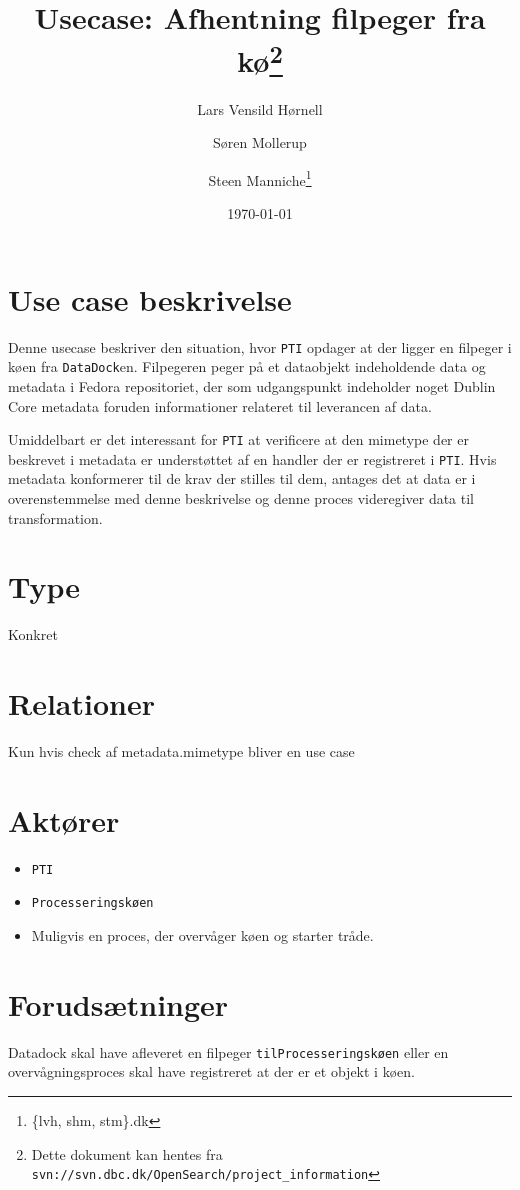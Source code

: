 \documentclass{article}
\author{Lars Vensild Hørnell \and Søren Mollerup \and Steen
  Manniche\thanks{\{lvh, shm, stm\}\@dbc.dk}}
\date{\today}
\title{Usecase: Afhentning filpeger fra kø\thanks{Dette dokument kan hentes fra \texttt{svn://svn.dbc.dk/OpenSearch/project\_information}}}
\begin{document}
\maketitle

\newpage

\tableofcontents

\section{Use case beskrivelse}
Denne usecase beskriver den situation, hvor
\texttt{PTI} opdager at der ligger en filpeger i køen fra
\texttt{DataDock}en. Filpegeren peger på et dataobjekt indeholdende
data og metadata i Fedora repositoriet, der som udgangspunkt
indeholder noget Dublin Core metadata foruden informationer relateret
til leverancen af data.

Umiddelbart er det interessant for \texttt{PTI} at
verificere at den mimetype der er beskrevet i metadata er understøttet
af en handler der er registreret i \texttt{PTI}. Hvis
metadata konformerer til de krav der stilles til dem, antages det at
data er i overenstemmelse med denne beskrivelse og denne proces
videregiver data til transformation.

\section{Type}
Konkret

\section{Relationer}
Kun hvis check af metadata.mimetype bliver en use case

\section{Aktører}
\begin{itemize}
\item \texttt{PTI}
\item \texttt{Processeringskøen} 
\item Muligvis en proces, der overvåger køen og starter tråde.
\end{itemize}

\section{Forudsætninger}
Datadock skal have afleveret en filpeger \texttt{tilProcesseringskøen} eller en overvågningsproces skal have
registreret at der er et objekt i køen.
\end{document}
